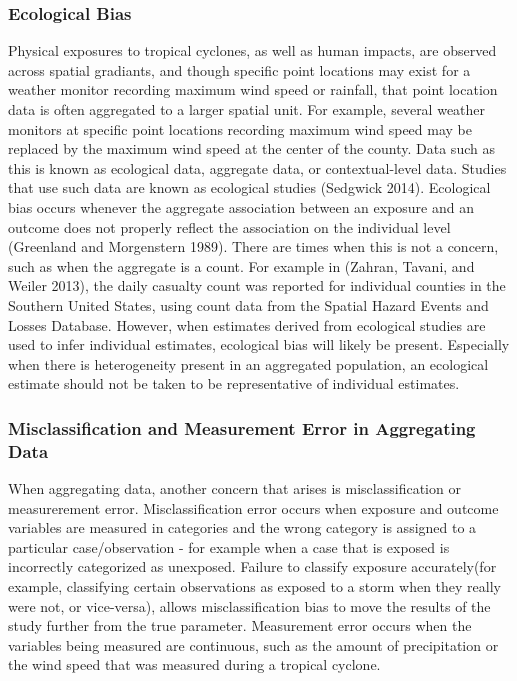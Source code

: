 \documentclass[
]{article}
\begin{document}
\hypertarget{ecological-bias}{%
\subsubsection{Ecological Bias}\label{ecological-bias}}

Physical exposures to tropical cyclones, as well as human impacts, are
observed across spatial gradiants, and though specific point locations
may exist for a weather monitor recording maximum wind speed or
rainfall, that point location data is often aggregated to a larger
spatial unit. For example, several weather monitors at specific point
locations recording maximum wind speed may be replaced by the maximum
wind speed at the center of the county. Data such as this is known as
ecological data, aggregate data, or contextual-level data. Studies that
use such data are known as ecological studies (Sedgwick 2014).
Ecological bias occurs whenever the aggregate association between an
exposure and an outcome does not properly reflect the association on the
individual level (Greenland and Morgenstern 1989). There are times when
this is not a concern, such as when the aggregate is a count. For
example in (Zahran, Tavani, and Weiler 2013), the daily casualty count
was reported for individual counties in the Southern United States,
using count data from the Spatial Hazard Events and Losses Database.
However, when estimates derived from ecological studies are used to
infer individual estimates, ecological bias will likely be present.
Especially when there is heterogeneity present in an aggregated
population, an ecological estimate should not be taken to be
representative of individual estimates.

\hypertarget{misclassification-and-measurement-error-in-aggregating-data}{%
\subsubsection{Misclassification and Measurement Error in Aggregating
Data}\label{misclassification-and-measurement-error-in-aggregating-data}}

When aggregating data, another concern that arises is misclassification
or measurerement error. Misclassification error occurs when exposure and
outcome variables are measured in categories and the wrong category is
assigned to a particular case/observation - for example when a case that
is exposed is incorrectly categorized as unexposed. Failure to classify
exposure accurately(for example, classifying certain observations as
exposed to a storm when they really were not, or vice-versa), allows
misclassification bias to move the results of the study further from the
true parameter. Measurement error occurs when the variables being
measured are continuous, such as the amount of precipitation or the wind
speed that was measured during a tropical cyclone.
\end{document}
